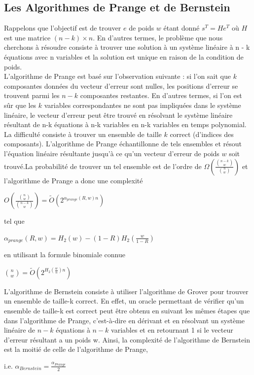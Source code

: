 \documentclass[12pt,openany]{report}
\begin{document}
\subsection{Les Algorithmes de Prange et de Bernstein}
Rappelons que l'objectif est de trouver $e$ de poids $w$ étant donné $s^T=\mathit{H}e^T$ où $\mathit{H}$ est une matrice $(n-k)\times n$.
En d'autres termes, le problème que nous cherchons à résoudre consiste à trouver une solution à un système linéaire à n - k équations avec n variables et la solution est unique en raison de la condition de poids.\\
L'algorithme de Prange est basé sur l'observation suivante : si l'on sait que $k$ composantes données du vecteur d'erreur sont nulles, les positions d'erreur se trouvent parmi les $n-k$ composantes restantes. 
En d'autres termes, si l'on est sûr que les $k$ variables correspondantes ne sont pas impliquées dans le système linéaire, le vecteur d'erreur peut être trouvé en résolvant le système linéaire résultant de n-k équations à n-k variables en n-k variables en temps polynomial.\\
La difficulté consiste à trouver un ensemble de taille $k$ correct (d'indices des composants). L'algorithme de Prange échantillonne de tels ensembles et résout l'équation linéaire résultante jusqu'à ce qu'un vecteur d'erreur de poids $w$ soit trouvé.La probabilité de trouver un tel ensemble est de l'ordre de $\Omega\left( \frac{ {{n-k}\choose w}}{ { n\choose w}} \right)   $ et l'algorithme de Prange a donc une complexité 
\begin{center}

{\Large
$ \mathit{O}\left( \frac{{n \choose w}}{{{n-k}\choose w }} \right)= \tilde{\mathit{O}}\left( 2^{\alpha_{prange}(R,w)n} \right)    $
}
\end{center}
tel que 
\begin{center}
{\Large

$ \alpha_{prange}(R,w)=\mathit{H}_{2}(w)-(1-R)\mathit{H}_{2}\left(\frac{w}{1-R} \right)    $
}
\end{center}
en utilisant la formule binomiale connue
\begin{center}
{\Large
$ {n \choose w}= \tilde{\mathit{O}}\left( 2^{H_{2}(\frac{w}{n})n} \right)  $
}
\end{center}
L'algorithme de Bernstein consiste à utiliser l'algorithme de Grover pour trouver un ensemble de taille-k correct. En effet, un
oracle permettant de vérifier qu'un ensemble de taille-k est correct peut être obtenu en suivant les mêmes étapes que dans l'algorithme de Prange, c'est-à-dire en dérivant et en résolvant un système linéaire de $n-k$ équations à $n-k$ variables
et en retournant 1 si le vecteur d'erreur résultant a un poids w. Ainsi, la complexité de l'algorithme de Bernstein est la moitié de celle de l'algorithme de Prange,\\
\begin{center}

 i.e.\hspace{0.3cm} {\Large $\alpha_{Bernstein}=\frac{\alpha_{Prange}}{2}$}

\end{center}
\end{document}
